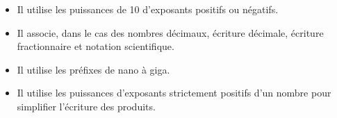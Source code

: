 \begin{prerequis}[Objectifs de 4\up{e}]    
    \begin{itemize}        
        \item Il utilise les puissances de 10 d’exposants positifs ou négatifs.
        \item Il associe, dans le cas des nombres décimaux, écriture décimale, écriture fractionnaire et
        notation scientifique.
        \item Il utilise les préfixes de nano à giga.        
        \item Il utilise les puissances d’exposants strictement positifs d’un nombre pour simplifier l’écriture
        des produits.
    \end{itemize}
\end{prerequis}
